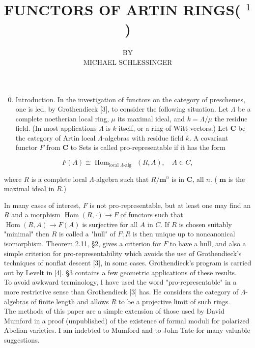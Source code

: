 \documentclass[10pt]{article}
\title{FUNCTORS OF ARTIN RINGS( ${ }^{1}$ ) }
\author{BY\\
MICHAEL SCHLESSINGER}
\date{}
\begin{document}
\maketitle


\begin{enumerate}
  \setcounter{enumi}{-1}
  \item Introduction. In the investigation of functors on the category of preschemes, one is led, by Grothendieck [3], to consider the following situation. Let $\Lambda$ be a complete noetherian local ring, $\mu$ its maximal ideal, and $k=\Lambda / \mu$ the residue field. (In most applications $\Lambda$ is $k$ itself, or a ring of Witt vectors.) Let $\boldsymbol{C}$ be the category of Artin local $\Lambda$-algebras with residue field $k$. A covariant functor $F$ from $\boldsymbol{C}$ to Sets is called pro-representable if it has the form
\end{enumerate}

$$
F(A) \cong \operatorname{Hom}_{\text {local } \Lambda \text {-alg. }}(R, A), \quad A \in C,
$$

where $R$ is a complete local $\Lambda$-algebra such that $R / \boldsymbol{m}^{n}$ is in $\boldsymbol{C}$, all $n$. ( $\boldsymbol{m}$ is the maximal ideal in $R$.)

In many cases of interest, $F$ is not pro-representable, but at least one may find an $R$ and a morphism $\operatorname{Hom}(R, \cdot) \rightarrow F$ of functors such that $\operatorname{Hom}(R, A) \rightarrow F(A)$ is surjective for all $A$ in $C$. If $R$ is chosen suitably "minimal" then $R$ is called a "hull" of $F ; R$ is then unique up to noncanonical isomorphism. Theorem 2.11, §2, gives a criterion for $F$ to have a hull, and also a simple criterion for pro-representability which avoids the use of Grothendieck's techniques of nonflat descent [3], in some cases. Grothendieck's program is carried out by Levelt in [4]. §3 contains a few geometric applications of these results.\\[0pt]
To avoid awkward terminology, I have used the word "pro-representable" in a more restrictive sense than Grothendieck [3] has. He considers the category of $\Lambda$-algebras of finite length and allows $R$ to be a projective limit of such rings.\\
The methods of this paper are a simple extension of those used by David Mumford in a proof (unpublished) of the existence of formal moduli for polarized Abelian varieties. I am indebted to Mumford and to John Tate for many valuable suggestions.
\end{document}
